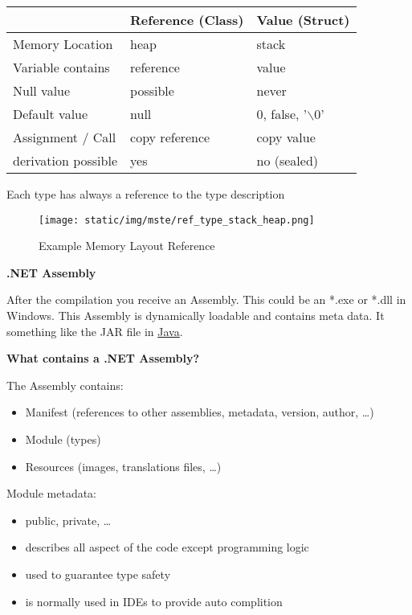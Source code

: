 \documentclass[11pt,twoside,landscape]{article}
\begin{document}
\begin{multicols}{3}
\begin{table}[htbp]
\label{tab:orge6765b4}
\centering
\begin{tabular}{lll}
 & Reference (Class) & Value (Struct)\\
\hline
Memory Location & heap & stack\\
Variable contains & reference & value\\
Null value & possible & never\\
Default value & null & 0, false, '$\backslash$0'\\
Assignment / Call & copy reference & copy value\\
derivation possible & yes & no (sealed)\\
\end{tabular}
\end{table}

Each type has always a reference to the type description 

\begin{figure}[htbp]
\centering
\texttt{[image: static/img/mste/ref\_type\_stack\_heap.png]}
\caption{\label{fig:org0fb3e9f}Example Memory Layout Reference}
\end{figure}

\textbf{.NET Assembly}

After the compilation you receive an Assembly.
This could be an *.exe or *.dll in Windows.
This Assembly is dynamically loadable and contains meta data.
It something like the JAR file in \href{../../../roam/20201116150053-java.org}{Java}.

\textbf{What contains a .NET Assembly?}

The Assembly contains:
\begin{itemize}
\item Manifest (references to other assemblies, metadata, version, author, \ldots{})
\item Module (types)
\item Resources  (images, translations files, \ldots{})
\end{itemize}


Module metadata:
\begin{itemize}
\item public, private, \ldots{}
\item describes all aspect of the code except programming logic
\item used to guarantee type safety
\item is normally used in IDEs to provide auto complition
\end{itemize}



\end{multicols}
\end{document}

